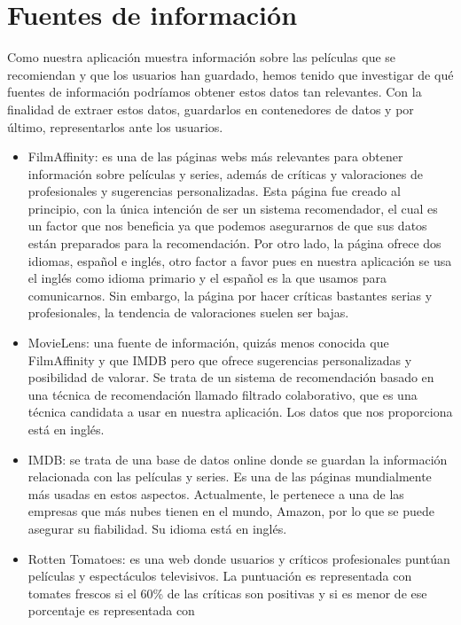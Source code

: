 \section{Fuentes de información}
\label{makereference2.2}
Como nuestra aplicación muestra información sobre las películas que se recomiendan y que los usuarios han guardado, hemos
tenido que investigar de qué fuentes de información podríamos obtener estos datos tan relevantes. Con la finalidad de extraer
estos datos, guardarlos en contenedores de datos y por último, representarlos ante los usuarios.
\begin{itemize}
    \item FilmAffinity\cite{filmaffinity}: es una de las páginas webs más relevantes para obtener información sobre películas y series, además de críticas y valoraciones de profesionales y sugerencias personalizadas.
    Esta página fue creado al principio, con la única intención de ser un sistema recomendador, el cual es un factor que nos beneficia ya que podemos asegurarnos de que sus datos están preparados para la recomendación.
    Por otro lado, la página ofrece dos idiomas, español e inglés, otro factor a favor pues en nuestra aplicación se usa el inglés como idioma primario y el español es la que usamos para comunicarnos. Sin embargo, la página por 
    hacer críticas bastantes serias y profesionales, la tendencia de valoraciones suelen ser bajas.
    \item MovieLens\cite{movielens}: una fuente de información, quizás menos conocida que FilmAffinity y que IMDB pero que ofrece sugerencias personalizadas y posibilidad de valorar. Se trata de un sistema de recomendación basado en una técnica de recomendación 
    llamado filtrado colaborativo\cite{filtradocolaborativo}, que es una técnica candidata a usar en nuestra aplicación. Los datos que nos proporciona está en inglés.
    \item IMDB\cite{imdb}: se trata de una base de datos online donde se guardan la información relacionada con las películas y series. Es una de las páginas mundialmente más usadas en estos aspectos.
    Actualmente, le pertenece a una de las empresas que más nubes tienen en el mundo, Amazon, por lo que se puede asegurar su fiabilidad. Su idioma está en inglés.
    \item Rotten Tomatoes\cite{rottentomatoes}: es una web donde usuarios y
     críticos profesionales puntúan películas y espectáculos televisivos.
    La puntuación es representada con tomates frescos si el 60\% de las
     críticas son positivas y si es menor de ese porcentaje es representada con

\end{itemize}
